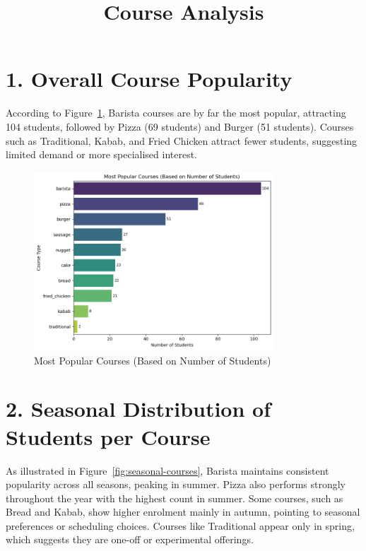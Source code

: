\documentclass[12pt,a4paper]{article}
\title{Course Analysis}
\date{}
\begin{document}
\maketitle

\section*{1. Overall Course Popularity}
According to Figure~\ref{fig:most-popular-courses}, Barista courses are by far the most popular, attracting 104 students, followed by Pizza (69 students) and Burger (51 students). Courses such as Traditional, Kabab, and Fried Chicken attract fewer students, suggesting limited demand or more specialised interest.

\begin{figure}[h!]
    \centering
    \includegraphics[width=0.8\textwidth]{Most Popular Courses (Based on Number of Students).png}
    \caption{Most Popular Courses (Based on Number of Students)}
    \label{fig:most-popular-courses}
\end{figure}

\section*{2. Seasonal Distribution of Students per Course}
As illustrated in Figure~\ref{fig:seasonal-courses}, Barista maintains consistent popularity across all seasons, peaking in summer.  
Pizza also performs strongly throughout the year with the highest count in summer.  
Some courses, such as Bread and Kabab, show higher enrolment mainly in autumn, pointing to seasonal preferences or scheduling choices.  
Courses like Traditional appear only in spring, which suggests they are one-off or experimental offerings.
\end{document}

